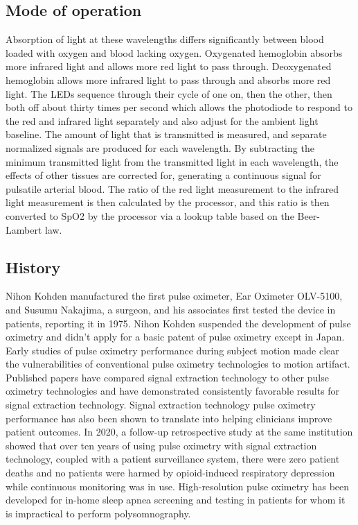 \documentclass[12pt]{article}
\begin{document}
\subsection{Mode of operation}
Absorption of light at these wavelengths differs significantly between blood loaded with oxygen and blood lacking oxygen.
Oxygenated hemoglobin absorbs more infrared light and allows more red light to pass through.
Deoxygenated hemoglobin allows more infrared light to pass through and absorbs more red light.
The LEDs sequence through their cycle of one on, then the other, then both off about thirty times per second which allows the photodiode to respond to the red and infrared light separately and also adjust for the ambient light baseline.
The amount of light that is transmitted is measured, and separate normalized signals are produced for each wavelength.
By subtracting the minimum transmitted light from the transmitted light in each wavelength, the effects of other tissues are corrected for, generating a continuous signal for pulsatile arterial blood.
The ratio of the red light measurement to the infrared light measurement is then calculated by the processor, and this ratio is then converted to SpO2 by the processor via a lookup table based on the Beer-Lambert law.

\subsection{History}
Nihon Kohden manufactured the first pulse oximeter, Ear Oximeter OLV-5100, and Susumu Nakajima, a surgeon, and his associates first tested the device in patients, reporting it in 1975.
Nihon Kohden suspended the development of pulse oximetry and didn't apply for a basic patent of pulse oximetry except in Japan.
Early studies of pulse oximetry performance during subject motion made clear the vulnerabilities of conventional pulse oximetry technologies to motion artifact.
Published papers have compared signal extraction technology to other pulse oximetry technologies and have demonstrated consistently favorable results for signal extraction technology.
Signal extraction technology pulse oximetry performance has also been shown to translate into helping clinicians improve patient outcomes.
In 2020, a follow-up retrospective study at the same institution showed that over ten years of using pulse oximetry with signal extraction technology, coupled with a patient surveillance system, there were zero patient deaths and no patients were harmed by opioid-induced respiratory depression while continuous monitoring was in use.
High-resolution pulse oximetry has been developed for in-home sleep apnea screening and testing in patients for whom it is impractical to perform polysomnography.
\clearpage
\end{document}
